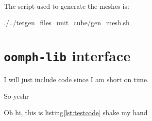 \documentclass[12pt,twoside,a4paper]{article}
\numberwithin{equation}{section}
\newcommand{\oomphlib}{\texttt{oomph-lib}}
\begin{document}
The script used to generate the meshes is:

                 {./../tetgen_files_unit_cube/gen_mesh.sh}



\section[\oomphlib{} interface]{\oomphlib{} interface}
I will just include code since I am short on time.



\newpage
So yeshr


Oh hi, this is listing\cref{lst:testcode} shake my  hand

















\newpage
{}
\printbibliography[prenote=myprenote]
 
\end{document}
